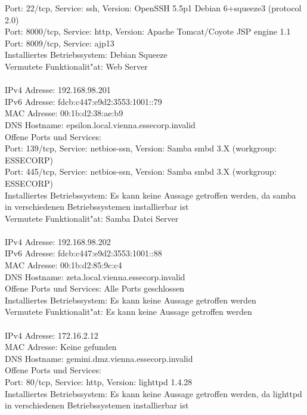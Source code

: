 \documentclass[12pt,a4paper,titlepage,oneside]{scrartcl}
\begin{document}
Port: 22/tcp, Service: ssh, Version: OpenSSH 5.5p1 Debian 6+squeeze3 (protocol 2.0)\\
Port: 8000/tcp, Service: http, Version: Apache Tomcat/Coyote JSP engine 1.1\\
Port: 8009/tcp, Service: ajp13\\
Installiertes Betriebssystem: Debian Squeeze\\
Vermutete Funktionalit"at: Web Server\\
\\
IPv4 Adresse: 192.168.98.201\\
IPv6 Adresse: fdcb:c447:e9d2:3553:1001::79\\
MAC Adresse: 00:1b:d2:38:ae:b9\\
DNS Hostname: epsilon.local.vienna.essecorp.invalid\\
Offene Ports und Services:\\
Port: 139/tcp, Service: netbios-ssn, Version: Samba smbd 3.X (workgroup: ESSECORP)\\
Port: 445/tcp, Service: netbios-ssn, Version: Samba smbd 3.X (workgroup: ESSECORP)\\
Installiertes Betriebssystem: Es kann keine Aussage getroffen werden, da samba in verschiedenen Betriebssystemen installierbar ist\\
Vermutete Funktionalit"at: Samba Datei Server\\
\\
IPv4 Adresse: 192.168.98.202\\
IPv6 Adresse: fdcb:c447:e9d2:3553:1001::88\\
MAC Adresse: 00:1b:d2:85:9c:c4\\
DNS Hostname: zeta.local.vienna.essecorp.invalid\\
Offene Ports und Services: Alle Ports geschlossen\\
Installiertes Betriebssystem: Es kann keine Aussage getroffen werden\\
Vermutete Funktionalit"at: Es kann keine Aussage getroffen werden\\
\\
IPv4 Adresse: 172.16.2.12\\
MAC Adresse: Keine gefunden\\
DNS Hostname: gemini.dmz.vienna.essecorp.invalid\\
Offene Ports und Services:\\
Port: 80/tcp, Service: http, Version: lighttpd 1.4.28\\
Installiertes Betriebssystem: Es kann keine Aussage getroffen werden, da lighttpd in verschiedenen Betriebssystemen installierbar ist\\
\end{document}
